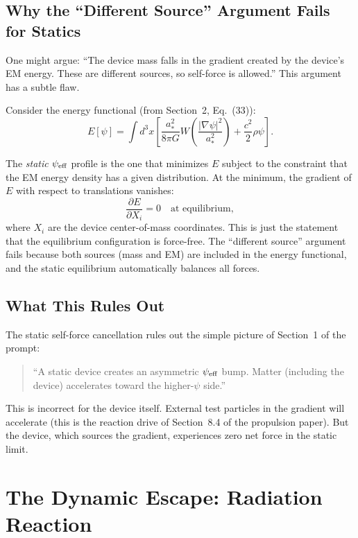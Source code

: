 \documentclass[11pt]{article}
\newcommand{\psieff}{\psi_{\rm eff}}
\begin{document}
\subsection{Why the ``Different Source'' Argument Fails for Statics}

One might argue: ``The device mass falls in the gradient created by the
device's EM energy. These are different sources, so self-force is
allowed.'' This argument has a subtle flaw.

Consider the energy functional (from Section~2, Eq.~(33)):
\begin{equation}
E[\psi] = \int d^3x\left[\frac{a_*^2}{8\pi G}
W\!\left(\frac{|\nabla\psi|^2}{a_*^2}\right)
+ \frac{c^2}{2}\rho\psi\right].
\end{equation}

The \emph{static} $\psieff$ profile is the one that minimizes $E$
subject to the constraint that the EM energy density has a given
distribution. At the minimum, the gradient of $E$ with respect to
translations vanishes:
\begin{equation}
\frac{\partial E}{\partial X_i} = 0 \quad \text{at equilibrium},
\end{equation}
where $X_i$ are the device center-of-mass coordinates. This is just
the statement that the equilibrium configuration is force-free. The
``different source'' argument fails because both sources (mass and EM)
are included in the energy functional, and the static equilibrium
automatically balances all forces.

\subsection{What This Rules Out}

The static self-force cancellation rules out the simple picture of
Section~1 of the prompt:
\begin{quote}
``A static device creates an asymmetric $\psieff$ bump. Matter (including
the device) accelerates toward the higher-$\psi$ side.''
\end{quote}
This is incorrect for the device itself. External test particles in
the gradient will accelerate (this is the reaction drive of
Section~8.4 of the propulsion paper). But the device, which sources
the gradient, experiences zero net force in the static limit.

\section{The Dynamic Escape: Radiation Reaction}\label{sec:radiation-reaction}
\end{document}
